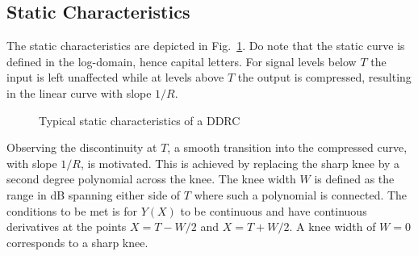 \documentclass[../main2.tex]{subfiles}
\providecommand{\rootdir}{..}
\begin{document}
\subsection{Static Characteristics}
The static characteristics are depicted in Fig.~\ref{fig:typical_static_detailed}. Do note that the static curve is defined in the log-domain, hence capital letters. For signal levels below $T$ the input is left unaffected while at levels above $T$ the output is compressed, resulting in the linear curve with slope $1/R$. 

\begin{figure}
\centerline{}
\caption{Typical static characteristics of a DDRC}
\label{fig:typical_static_detailed}
\end{figure}

Observing the discontinuity at $T$, a smooth transition into the compressed curve, with slope $1/R$, is motivated. This is achieved by replacing the sharp knee by a second degree polynomial\cite{frindle1996implementation}\cite{reiss2012tutorial} across the knee. The knee width $W$ is defined as the range in dB spanning either side of $T$ where such a polynomial is connected. The conditions to be met is for $Y(X)$ to be continuous and have continuous derivatives at the points $X=T-W/2$ and $X=T+W/2$. A knee width of $W=0$ corresponds to a sharp knee. 
\end{document}
